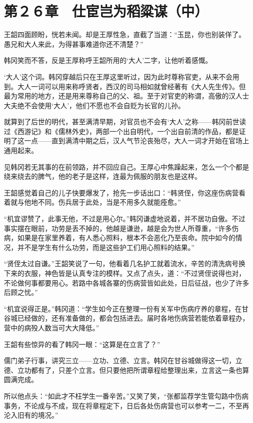 \section{第２６章　仕宦岂为稻粱谋（中）}

王韶四面顾盼，恍若未闻。却是王厚性急，直截了当道：“玉昆，你也别装佯了。愚兄和大人来此，为得甚事难道你还不清楚？”

韩冈笑而不答，反是王厚称呼王韶所用的‘大人’二字，让他听着感慨。

‘大人’这个词。韩冈穿越后只在王厚这里听过，因为此时尊称官吏，从来不会用到。大人一词可以用来称呼贤者，西汉的司马相如就曾经著有《大人先生传》。但最为常用的地方，还是用来尊称自己的父、祖。至于对官吏的称谓，高傲的汉人士大夫绝不会使用‘大人’，他们不愿也不会自贬为长官的儿孙。

就算到了后世的明代，甚至满清早期，对官员也不会有‘大人’之称——韩冈前世读过《西游记》和《儒林外史》，两部一个出自明代，一个出自前清的作品，都是证明了这一点——直到满清中期之后，汉人气节沦丧殆尽，大人一词才开始在官场上通用起来。

见韩冈若无其事的在前领路，并不回应自己。王厚心中焦躁起来，怎么一个个都是绕来绕去的脾气，他的老子是这样，连最为佩服的朋友也是这样。

王韶感觉着自己的儿子快要爆发了，抢先一步话出口：“韩贤侄，你这座伤病营看着就与他地不同。伤兵居于此处，当是不用多久就能痊愈。”

“机宜谬赞了，此事无他，不过是用心尔。”韩冈谦虚地说着，并不居功自傲。不过事实摆在眼前，功劳是丢不掉的，他越是谦逊，越是会为世人所尊重，“许多伤病，如果是在家里养着，有人悉心照料，根本不会恶化乃至丧命。院中如今的情况，并不是学生有什么功劳，而是这些护工们用心照料的结果。”

“贤侄太过自谦。”王韶笑说了一句，他看着几名护工就着流水，辛苦的清洗病号换下来的衣服，神色皆是认真专注的模样。又点了点头，道：“不过贤侄说得也对，不论做何事都要用心。若路中各城各寨的伤病营皆如此处，日后征战，也少了许多后顾之忧。”

“机宜说得正是。”韩冈道：“学生如今正在整理一份有关军中伤病疗养的章程，在甘谷城已经做的，还有准备做的，都会包括进去。届时各地伤病营若能依着章程办，营中的病殁人数当可大大降低。”

王韶有些惊异的看了韩冈一眼：“这算是在立言了？”

儒门弟子行事，讲究三立——立功、立德、立言。韩冈在甘谷城做得这一切，立德、立功都有了，只差个立言。但只要他把所谓章程给整理出来，立言这一条也算圆满完成。

所以他点头：“如此才不枉学生一番辛苦。”又笑了笑，“张都监荐学生管勾路中伤病事务，不论成与不成，现在将章程定下，日后各处伤病营也可以参考一二，不至再沦入旧有的境况。”

